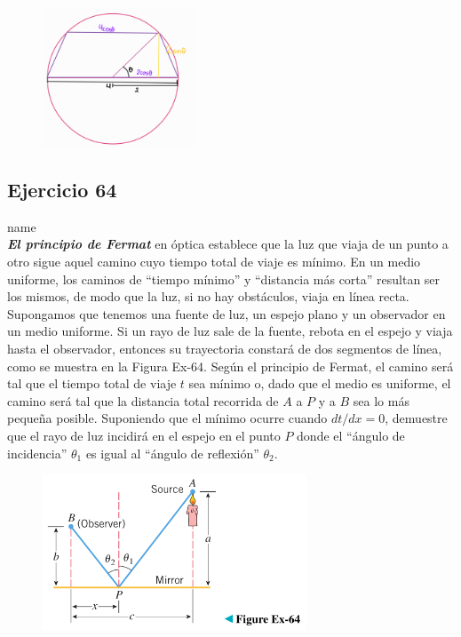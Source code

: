 \documentclass[12pt]{article}
\begin{document}
\begin{figure}[H]
\centering
\includegraphics[width=0.4\textwidth]{../img/img_Lista3/trapecio.png}
\end{figure}

\subsection{Ejercicio 64} name \\

\textit{\textbf{El principio de Fermat}} en óptica establece que la luz que viaja de un punto a otro sigue aquel camino cuyo tiempo total de viaje es mínimo. En un medio uniforme, los caminos de ``tiempo mínimo'' y ``distancia más corta'' resultan ser los mismos, de modo que la luz, si no hay obstáculos, viaja en línea recta. Supongamos que tenemos una fuente de luz, un espejo plano y un observador en un medio uniforme. Si un rayo de luz sale de la fuente, rebota en el espejo y viaja hasta el observador, entonces su trayectoria constará de dos segmentos de línea, como se muestra en la Figura Ex-64. Según el principio de Fermat, el camino será tal que el tiempo total de viaje $t$ sea mínimo o, dado que el medio es uniforme, el camino será tal que la distancia total recorrida de $A$ a $P$ y a $B$ sea lo más pequeña posible. Suponiendo que el mínimo ocurre cuando $dt/dx = 0$, demuestre que el rayo de luz incidirá en el espejo en el punto $P$ donde el ``ángulo de incidencia'' $\theta_1$ es igual al ``ángulo de reflexión'' $\theta_2$.
\begin{figure}[H]
\centering
\includegraphics[width=0.7\textwidth]{../img/img_Lista3/3_64.png}
\end{figure}
\end{document}
